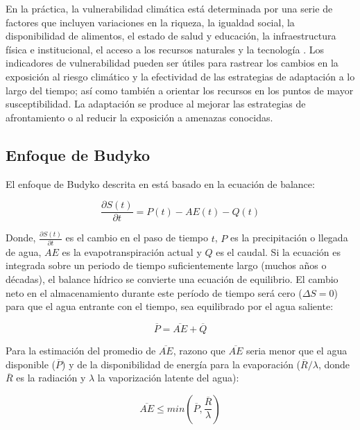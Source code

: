 \documentclass[12pt]{article}
\begin{document}
En la práctica, la vulnerabilidad climática está determinada por una serie de factores que incluyen variaciones en la riqueza, la igualdad social, la disponibilidad de alimentos, el estado de salud y educación, la infraestructura física e institucional, el acceso a los recursos naturales y la tecnología \citep{Brooks2005}. Los indicadores de vulnerabilidad pueden ser útiles para rastrear los cambios en la exposición al riesgo climático y la efectividad de las estrategias de adaptación a lo largo del tiempo; así como también a orientar los recursos en los puntos de mayor susceptibilidad. La adaptación se produce al mejorar las estrategias de afrontamiento o al reducir la exposición a amenazas conocidas.

\subsection{Enfoque de Budyko}

El enfoque de Budyko \citep{Budyko1961,Pike1964} descrita en \citet{Zhang2008} está basado en la ecuación de balance:

\begin{equation}
\frac{\partial S(t)}{\partial t} = P(t) - AE(t) - Q(t) 
\end{equation}

Donde, $\frac{\partial S(t)}{\partial t}$ es el cambio en el paso de tiempo $t$, $P$ es la precipitación o llegada de agua, $AE$ es la evapotranspiración actual y $Q$ es el caudal. Si la ecuación es integrada sobre un periodo de tiempo suficientemente largo (muchos años o décadas), el balance hídrico se convierte una ecuación de equilibrio. El cambio neto en el almacenamiento durante este período de tiempo será cero ($\Delta S = 0$) para que el agua entrante con el tiempo, sea equilibrado por el agua saliente:

\begin{equation}
\overline{P} = \overline{AE} + \overline{Q} 
\label{equ:WB}
\end{equation}

Para la estimación del promedio de $\overline{AE}$, \citet{Budyko1961} razono que $\overline{AE}$ seria menor que el agua disponible ($\overline{P}$) y de la disponibilidad de energía para la evaporación ($\overline{R}/\lambda$, donde $\overline{R}$ es la radiación y $\lambda$ la vaporización latente del agua):

\begin{equation}
\overline{AE} \leq min(\overline{P}, \frac{\overline{R}}{\lambda })
\end{equation}
\end{document}
